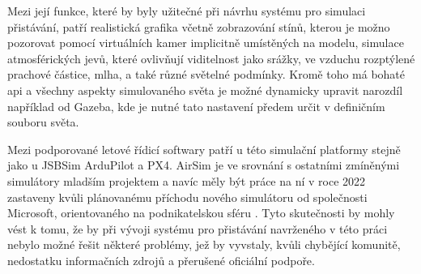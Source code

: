         Mezi její funkce, které by byly užitečné při návrhu systému pro simulaci přistávání, patří realistická grafika včetně zobrazování stínů, kterou je možno pozorovat pomocí virtuálních kamer implicitně umístěných na modelu, simulace atmosférických jevů, které ovlivňují viditelnost jako srážky, ve vzduchu rozptýlené prachové částice, mlha, a také různé světelné podmínky. Kromě toho má bohaté \acrshort{api} a všechny aspekty simulovaného světa je možné dynamicky upravit narozdíl například od Gazeba, kde je nutné tato nastavení předem určit v definičním souboru světa. \cite{airsim}

        Mezi podporované letové řídicí softwary patří u této simulační platformy stejně jako u JSBSim ArduPilot a PX4. AirSim je ve srovnání s ostatními zmíněnými simulátory mladším projektem a navíc měly být práce na ní v roce 2022 zastaveny kvůli plánovanému příchodu nového simulátoru od společnosti Microsoft, orientovaného na podnikatelskou sféru \cite{airsimweb}. Tyto skutečnosti by mohly vést k tomu, že by při vývoji systému pro přistávání navrženého v této práci nebylo možné řešit některé problémy, jež by vyvstaly, kvůli chybějící komunitě, nedostatku informačních zdrojů a přerušené oficiální podpoře.